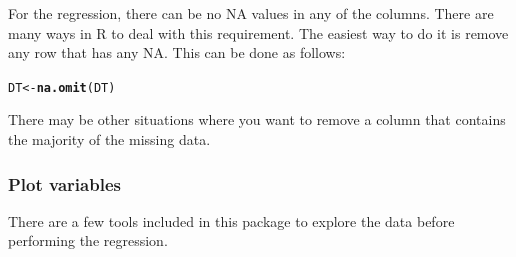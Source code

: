 \documentclass[a4paper,11pt]{article}\usepackage[]{graphicx}\usepackage[]{color}
\makeatletter
\newcommand{\hlstd}[1]{\textcolor[rgb]{0.345,0.345,0.345}{#1}}%
\newcommand{\hlkwb}[1]{\textcolor[rgb]{0.69,0.353,0.396}{#1}}%
\newcommand{\hlkwd}[1]{\textcolor[rgb]{0.737,0.353,0.396}{\textbf{#1}}}%
\newenvironment{kframe}{%
 \def\at@end@of@kframe{}%
 \ifinner\ifhmode%
  \def\at@end@of@kframe{\end{minipage}}%
  \begin{minipage}{\columnwidth}%
 \fi\fi%
 \def\FrameCommand##1{\hskip\@totalleftmargin \hskip-\fboxsep
 \colorbox{shadecolor}{##1}\hskip-\fboxsep
     \hskip-\linewidth \hskip-\@totalleftmargin \hskip\columnwidth}%
 \MakeFramed {\advance\hsize-\width
   \@totalleftmargin\z@ \linewidth\hsize
   \@setminipage}}%
 {\par\unskip\endMakeFramed%
 \at@end@of@kframe}
\newenvironment{knitrout}{}{} %
\makeatother
\begin{document}
For the regression, there can be no NA values in any of the columns. There are many ways in R to deal with this requirement. The easiest way to do it is remove any row that has any NA. This can be done as follows:

\begin{knitrout}
\color{fgcolor}\begin{kframe}
\begin{alltt}
\hlstd{DT} \hlkwb{<-} \hlkwd{na.omit}\hlstd{(DT)}
\end{alltt}
\end{kframe}
\end{knitrout}

There may be other situations where you want to remove a column that contains the majority of the missing data.

\subsubsection{Plot variables}
There are a few tools included in this package to explore the data before performing the regression.
\end{document}
